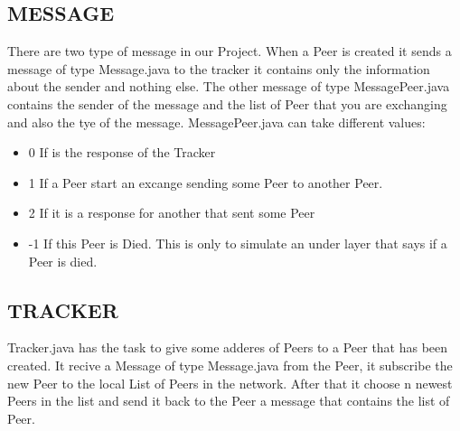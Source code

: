 \documentclass[a4paper,12pt,notitlepage]{article} %
\begin{document}
\subsection{MESSAGE}
	There are two type of message in our Project. When a Peer is 	created it sends a message of type Message.java to the tracker it contains only the information about the sender and nothing else. The other message of type MessagePeer.java contains the sender of the message and the list of Peer that you are exchanging and also the tye of the message. MessagePeer.java can take different values:
\begin{itemize}
  \item 0 If is the response of the Tracker
  \item 1 If a Peer start an excange sending some Peer to another Peer.
  \item 2 If it is a response for another that sent some Peer
  \item -1 If this Peer is Died. This is only to simulate an under layer that says if a Peer is died.
\end{itemize}

\subsection{TRACKER}
	Tracker.java has the task to give some adderes of Peers to a Peer that has been created. It recive a Message of type Message.java from the Peer, it subscribe the new Peer to the local List of Peers in the network. After that it choose n newest Peers in the list and send it back to the Peer a message that contains the list of Peer.
\end{document}
